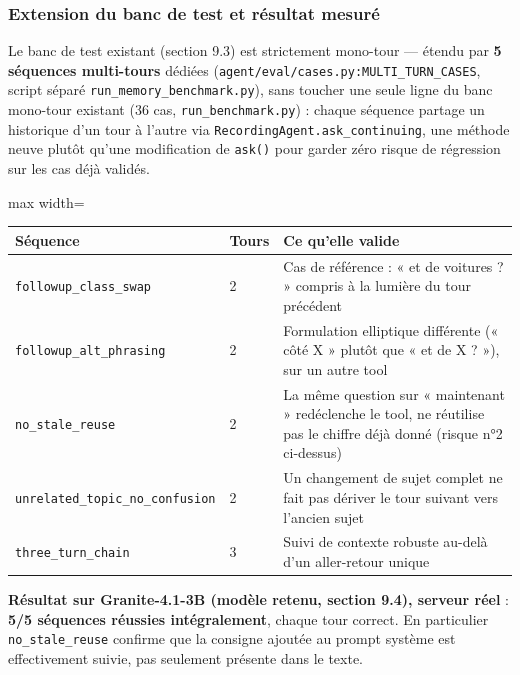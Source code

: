 \documentclass[11pt,a4paper]{article}
\let\Oldsubsubsection\subsubsection
\renewcommand{\subsubsection}{\FloatBarrier\Oldsubsubsection}
\begin{document}
    \subsubsection{Extension du banc de test et résultat mesuré}
    
    Le banc de test existant (section 9.3) est strictement mono-tour ---
    étendu par \textbf{5 séquences multi-tours} dédiées
    (\texttt{agent/eval/cases.py:MULTI\_TURN\_CASES}, script séparé
    \texttt{run\_memory\_benchmark.py}), sans toucher une seule ligne du
    banc mono-tour existant (36 cas, \texttt{run\_benchmark.py}) : chaque
    séquence partage un historique d'un tour à l'autre via
    \texttt{RecordingAgent.ask\_continuing}, une méthode neuve plutôt qu'une
    modification de \texttt{ask()} pour garder zéro risque de régression
    sur les cas déjà validés.
    
    \begin{table}[!htbp]
    \centering
    \small
    \begin{adjustbox}{max width=\linewidth}
    \begin{tabular}{@{}p{5.2cm}p{1.2cm}p{9.5cm}@{}}
    \toprule
    \textbf{Séquence} & \textbf{Tours} & \textbf{Ce qu'elle valide} \\
    \midrule
    \texttt{followup\_class\_swap} & 2 & Cas de référence : « et de voitures ? » compris à la lumière du tour précédent \\
    \texttt{followup\_alt\_phrasing} & 2 & Formulation elliptique différente (« côté X » plutôt que « et de X ? »), sur un autre tool \\
    \texttt{no\_stale\_reuse} & 2 & La même question sur « maintenant » redéclenche le tool, ne réutilise pas le chiffre déjà donné (risque n°2 ci-dessus) \\
    \texttt{unrelated\_topic\_no\_confusion} & 2 & Un changement de sujet complet ne fait pas dériver le tour suivant vers l'ancien sujet \\
    \texttt{three\_turn\_chain} & 3 & Suivi de contexte robuste au-delà d'un aller-retour unique \\
    \bottomrule
    \end{tabular}
    \end{adjustbox}
    \end{table}
    
    \textbf{Résultat sur Granite-4.1-3B (modèle retenu, section 9.4), serveur
    réel} : \textbf{5/5 séquences réussies intégralement}, chaque tour
    correct. En particulier \texttt{no\_stale\_reuse} confirme que la
    consigne ajoutée au prompt système est effectivement suivie, pas
    seulement présente dans le texte.
    
\end{document}
